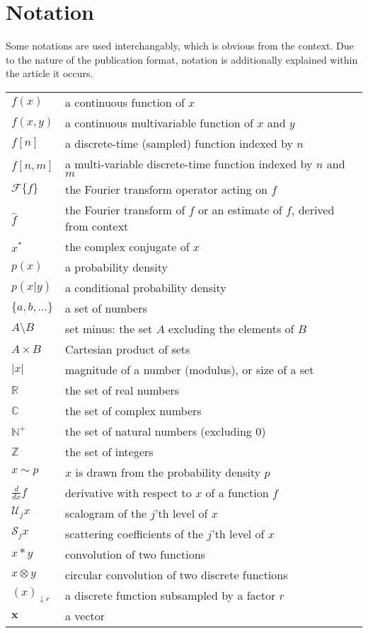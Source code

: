 \section*{Notation}
Some notations are used interchangably, which is obvious from the context. Due to the nature of the publication format, notation is additionally explained within the article it occurs.

\begin{tabular}{p{} p{}}
    $f(x)$ & a continuous function of $x$ \\
    $f(x, y)$ & a continuous multivariable function of $x$ and $y$ \\
    $f[n]$ & a discrete-time (sampled) function indexed by $n$ \\
    $f[n, m]$ & a multi-variable discrete-time function indexed by $n$ and $m$ \\
    $\mathcal{F} \{f\}$ & the Fourier transform operator acting on $f$\\
    $\hat{f}$ & the Fourier transform of $f$ or an estimate of $f$, derived from context\\
    $x^*$ & the complex conjugate of $x$\\
    $p(x)$ & a probability density \\
    $p(x|y)$ & a conditional probability density \\
    $\{a, b, ...\}$ & a set of numbers\\
    $A \setminus B$ & set minus: the set $A$ excluding the elements of $B$\\
    $A \times B$ & Cartesian product of sets\\
    $| x |$ & magnitude of a number (modulus), or size of a set\\
    $\mathbb{R}$ & the set of real numbers\\
    $\mathbb{C}$ & the set of complex numbers\\
    $\mathbb{N^+}$ & the set of natural numbers (excluding 0)\\
    $\mathbb{Z}$ & the set of integers\\
    $x \sim p$ & $x$ is drawn from the probability density $p$\\
    $\frac{d}{dx} f$ & derivative with respect to $x$ of a function $f$\\
    $\mathcal{U}_j x$ & scalogram of the $j$'th level of $x$\\
    $\mathcal{S}_j x$ & scattering coefficients of the $j$'th level of $x$\\
    $x * y$ & convolution of two functions\\
    $x \otimes y$ & circular convolution of two discrete functions\\
    $(x)_{\downarrow r}$ & a discrete function subsampled by a factor $r$\\
    $\mathbf{x}$ & a vector\\
\end{tabular}

